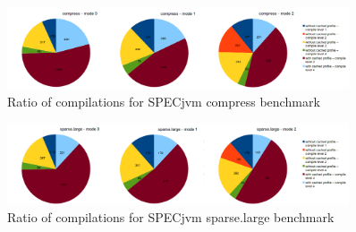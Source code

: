 \begin{figure}[ht]
  \begin{center}
    \centering
    \includegraphics[width=0.9\textwidth]{figures/compress_compilations.png}
    \caption{Ratio of compilations for SPECjvm compress benchmark}
    \label{f:compress_compilations}
  \end{center}
\end{figure}
\begin{figure}[ht]
  \begin{center}
    \centering
    \includegraphics[width=0.9\textwidth]{figures/sparselarge_compilations.png}
    \caption{Ratio of compilations for SPECjvm sparse.large benchmark}
    \label{f:sparselarge_compilations}
  \end{center}
\end{figure}
\clearpage
